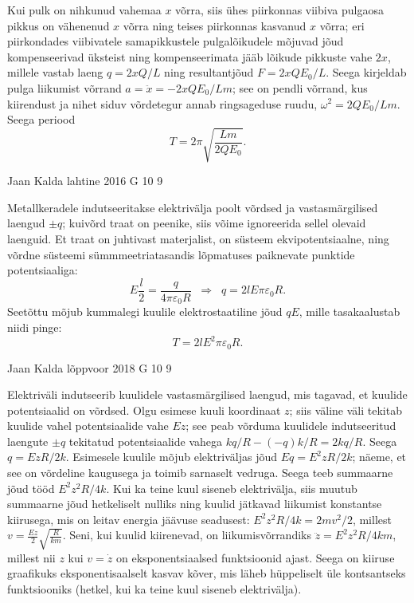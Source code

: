 \documentclass[11pt, twoside]{article}
\begin{document}
{{\osa Kui pulk on nihkunud vahemaa $x$ võrra, siis ühes piirkonnas viibiva pulgaosa pikkus
on vähenenud $x$ võrra ning teises piirkonnas kasvanud $x$ võrra; eri piirkondades viibivatele
samapikkustele pulgalõikudele mõjuvad jõud kompenseerivad üksteist  ning kompenseerimata jääb lõikude pikkuste vahe $2x$, millele vastab laeng
$q=2xQ/L$ ning resultantjõud $F=2xQE_0/L$.
Seega kirjeldab pulga liikumist võrrand $a=\ddot x= -2xQE_0/Lm$;
see on pendli võrrand, kus kiirendust ja nihet siduv võrdetegur annab ringsageduse ruudu,
$\omega^2=2QE_0/Lm$. Seega periood 
\[ T=2\pi\sqrt{\frac{Lm}{2QE_0}}.\]
\fi
}

{Jaan Kalda} %
{lahtine} %
{2016} %
{G 10} %
{9} %
{

\ifSolution
Metallkeradele indutseeritakse elektrivälja poolt võrdsed ja vastasmärgilised laengud $\pm q$; kuivõrd traat on peenike,
siis võime ignoreerida sellel olevaid laenguid. Et traat on juhtivast materjalist, on süsteem ekvipotentsiaalne,
ning võrdne süsteemi sümmmeetriatasandis lõpmatuses paiknevate punktide potentsiaaliga:
$$E\frac l2=\frac q{4\pi\varepsilon_0R}\;\;\Rightarrow\;\; q=2lE\pi\varepsilon_0R.$$
Seetõttu mõjub kummalegi kuulile elektrostaatiline jõud $qE$, mille tasakaalustab niidi pinge:
$$T=2lE^2\pi\varepsilon_0R.$$
\fi
}

{Jaan Kalda} %
{lõppvoor} %
{2018} %
{G 10} %
{9} %
{

\ifSolution
Elektriväli indutseerib kuulidele vastasmärgilised laengud, mis tagavad, et kuulide potentsiaalid on võrdsed. Olgu esimese kuuli koordinaat $z$; siis väline väli tekitab kuulide vahel potentsiaalide vahe $Ez$; see peab võrduma kuulidele indutseeritud laengute $\pm q$ tekitatud potentsiaalide vahega $kq/R-(-q)k/R=2kq/R$. Seega $q=EzR/2k$. Esimesele kuulile mõjub elektriväljas jõud $Eq=E^2zR/2k$; näeme, et see on võrdeline kaugusega ja toimib sarnaselt vedruga. Seega teeb summaarne jõud tööd $E^2z^2R/4k$. Kui ka teine kuul siseneb elektrivälja, siis muutub summaarne jõud hetkeliselt nulliks ning kuulid jätkavad liikumist konstantse kiirusega, mis on leitav energia jäävuse seadusest: $E^2z^2R/4k=2mv^2/2$, millest $v=\frac {Ez}{2}\sqrt{\frac{R}{km}}$. Seni, kui kuulid kiirenevad, on liikumisvõrrandiks $\ddot z=E^2z^2R/4km$, millest nii $z$ kui $v=\dot z$ on eksponentsiaalsed funktsioonid ajast. Seega on kiiruse graafikuks eksponentisaalselt kasvav kõver, mis läheb hüppeliselt üle kontsantseks funktsiooniks (hetkel, kui ka teine kuul siseneb elektrivälja).
\fi
}

}
\end{document}
